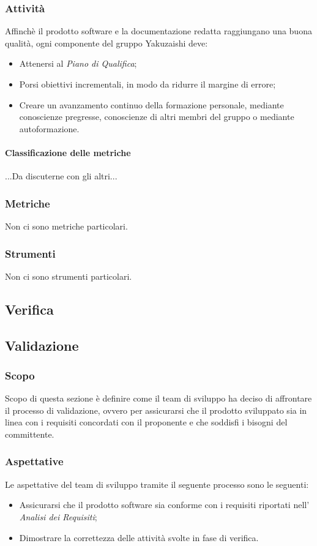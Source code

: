 \subsubsection{Attività}
Affinchè il prodotto software e la documentazione redatta raggiungano una buona qualità, ogni componente del gruppo Yakuzaishi deve:
\begin{itemize}
    \item Attenersi al \textit{Piano di Qualifica};
    \item Porsi obiettivi incrementali, in modo da ridurre il margine di errore;
    \item Creare un avanzamento continuo della formazione personale, mediante conoscienze pregresse, conoscienze di altri membri del gruppo o mediante autoformazione. 
 \end {itemize}   
\paragraph{Classificazione delle metriche}
...Da discuterne con gli altri...
\subsubsection{Metriche}
Non ci sono metriche particolari.
\subsubsection{Strumenti}
Non ci sono strumenti particolari.

\subsection{Verifica}

\subsection{Validazione}\label{subsection: validazione}
\subsubsection{Scopo}
Scopo di questa sezione è definire come il team di sviluppo ha deciso di affrontare il processo di validazione, ovvero per assicurarsi che il prodotto sviluppato sia in linea con i requisiti concordati con il proponente e che soddisfi i bisogni del committente.
\subsubsection{Aspettative}
Le aspettative del team di sviluppo tramite il seguente processo sono le seguenti: 
\begin{itemize}
    \item Assicurarsi che il prodotto software sia conforme con i requisiti riportati nell' \textit{Analisi dei Requisiti};
    \item  Dimostrare la correttezza delle attività svolte in fase di verifica.
\end{itemize}
